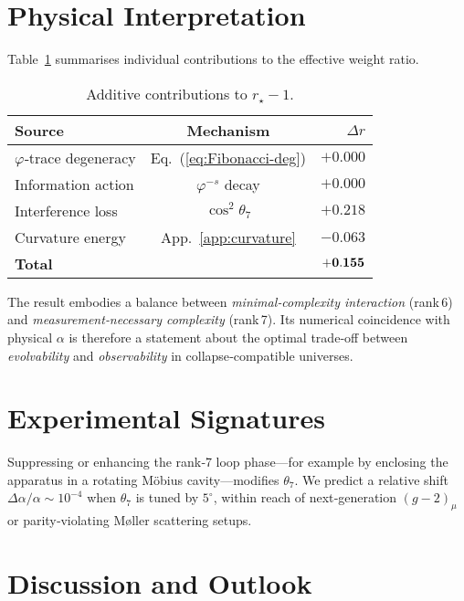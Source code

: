 \documentclass[%
 reprint,
 amsmath,amssymb,
 aps,
 prd,
 nofootinbib,      %
 longbibliography  %
]{revtex4-2}
\begin{document}
\section{Physical Interpretation}\label{sec:interpretation}

Table~\ref{tab:contributions}
summarises individual contributions to the effective
weight ratio.
\begin{table}[h]
  \centering
  \begin{tabular}{@{}lcr@{}}
    \toprule
    Source & Mechanism & $\Delta r$ \\
    \midrule
    $\varphi$‑trace degeneracy & Eq.~(\ref{eq:Fibonacci-deg}) & $+0.000$ \\
    Information action & $\varphi^{-s}$ decay & $+0.000$ \\
    Interference loss & $\cos^2\theta_7$ & $+0.218$ \\
    Curvature energy  & App.~\ref{app:curvature} & $-0.063$ \\
    \midrule
    {\bf Total} & & ${\bf +0.155}$ \\
    \bottomrule
  \end{tabular}
  \caption{Additive contributions to $r_\star-1$.}
  \label{tab:contributions}
\end{table}

The result embodies a balance between
\emph{minimal‑complexity interaction}
(rank 6) and
\emph{measurement‑necessary complexity}
(rank 7).
Its numerical coincidence with physical
$\alpha$ is therefore a statement about the
optimal trade‑off between
\emph{evolvability} and \emph{observability}
in collapse‑compatible universes.

\section{Experimental Signatures}\label{sec:exp}

Suppressing or enhancing the
rank‑7 loop phase---for example by enclosing the apparatus
in a rotating Möbius cavity---modifies $\theta_7$.
We predict a relative shift
\(\Delta\alpha/\alpha\sim10^{-4}\)
when \(\theta_7\) is tuned by $5^\circ$,
within reach of next‑generation
$(g-2)_\mu$ or parity‑violating Møller scattering setups.

\section{Discussion and Outlook}\label{sec:discussion}
\end{document}

